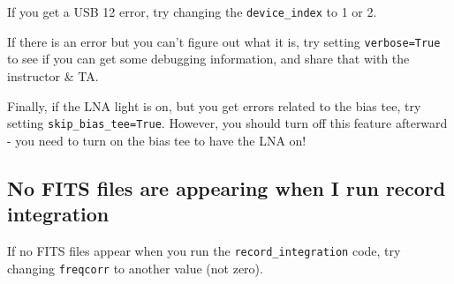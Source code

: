 \documentclass[11pt]{article}
\begin{document}
If you get a USB 12 error, try changing the \verb|device_index|
to 1 or 2.

If there is an error but you can't figure out what it is,
try setting \verb|verbose=True| to see if you can get some
debugging information, and share that with the instructor \& TA.

Finally, if the LNA light is on, but you get errors related
to the bias tee, try setting \verb|skip_bias_tee=True|.  However,
you should turn off this feature afterward - you need to turn
on the bias tee to have the LNA on!


\subsection{No FITS files are appearing when I run record integration}

If no FITS files appear when you run the \verb|record_integration| code, try
changing \verb|freqcorr| to another value (not zero).
\end{document}
